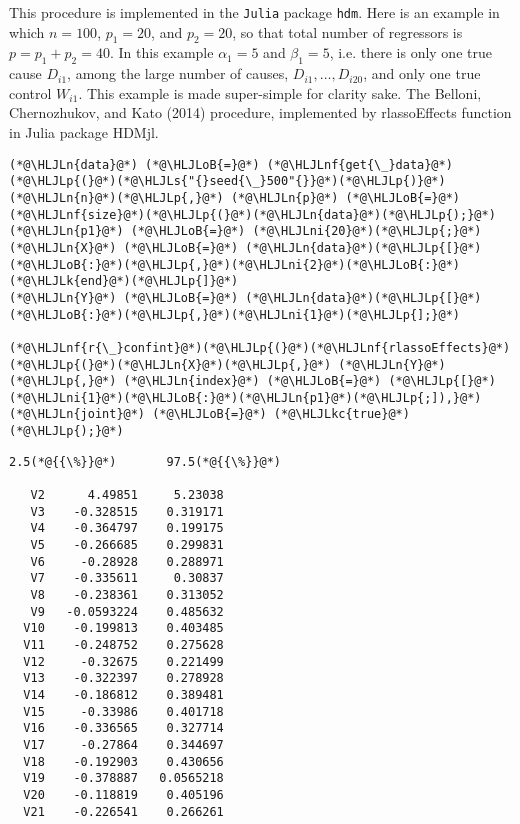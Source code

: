 \documentclass[12pt,a4paper]{article}
\newcommand{\HLJLk}[1]{\textcolor[RGB]{148,91,176}{\textbf{#1}}}
\newcommand{\HLJLkc}[1]{\textcolor[RGB]{59,151,46}{\textit{#1}}}
\newcommand{\HLJLn}[1]{#1}
\newcommand{\HLJLnf}[1]{\textcolor[RGB]{66,102,213}{#1}}
\newcommand{\HLJLs}[1]{\textcolor[RGB]{201,61,57}{#1}}
\newcommand{\HLJLni}[1]{\textcolor[RGB]{59,151,46}{#1}}
\newcommand{\HLJLoB}[1]{\textcolor[RGB]{102,102,102}{\textbf{#1}}}
\newcommand{\HLJLp}[1]{#1}
\begin{document}
This procedure is implemented in the \texttt{Julia} package \texttt{hdm}. Here is an example in which $n = 100$, $p_1 = 20$, and $p_2 = 20$, so that total number of regressors is $p = p_1 + p_2 = 40$. In this example $\alpha_1 = 5$ and $\beta_1 = 5$, i.e. there is only one true cause $D_{i1}$, among the large number of causes, $D_{i1}, \dots, D_{i20}$, and only one true control $W_{i1}$. This example is made super-simple for clarity sake. The Belloni, Chernozhukov, and Kato (2014) procedure, implemented by rlassoEffects function in Julia package HDMjl.


\begin{lstlisting}
(*@\HLJLn{data}@*) (*@\HLJLoB{=}@*) (*@\HLJLnf{get{\_}data}@*)(*@\HLJLp{(}@*)(*@\HLJLs{"{}seed{\_}500"{}}@*)(*@\HLJLp{)}@*)
(*@\HLJLn{n}@*)(*@\HLJLp{,}@*) (*@\HLJLn{p}@*) (*@\HLJLoB{=}@*) (*@\HLJLnf{size}@*)(*@\HLJLp{(}@*)(*@\HLJLn{data}@*)(*@\HLJLp{);}@*)
(*@\HLJLn{p1}@*) (*@\HLJLoB{=}@*) (*@\HLJLni{20}@*)(*@\HLJLp{;}@*)
(*@\HLJLn{X}@*) (*@\HLJLoB{=}@*) (*@\HLJLn{data}@*)(*@\HLJLp{[}@*)(*@\HLJLoB{:}@*)(*@\HLJLp{,}@*)(*@\HLJLni{2}@*)(*@\HLJLoB{:}@*)(*@\HLJLk{end}@*)(*@\HLJLp{]}@*)
(*@\HLJLn{Y}@*) (*@\HLJLoB{=}@*) (*@\HLJLn{data}@*)(*@\HLJLp{[}@*)(*@\HLJLoB{:}@*)(*@\HLJLp{,}@*)(*@\HLJLni{1}@*)(*@\HLJLp{];}@*)

(*@\HLJLnf{r{\_}confint}@*)(*@\HLJLp{(}@*)(*@\HLJLnf{rlassoEffects}@*)(*@\HLJLp{(}@*)(*@\HLJLn{X}@*)(*@\HLJLp{,}@*) (*@\HLJLn{Y}@*)(*@\HLJLp{,}@*) (*@\HLJLn{index}@*) (*@\HLJLoB{=}@*) (*@\HLJLp{[}@*)(*@\HLJLni{1}@*)(*@\HLJLoB{:}@*)(*@\HLJLn{p1}@*)(*@\HLJLp{;]),}@*) (*@\HLJLn{joint}@*) (*@\HLJLoB{=}@*) (*@\HLJLkc{true}@*)(*@\HLJLp{);}@*)
\end{lstlisting}

\begin{lstlisting}
2.5(*@{{\%}}@*)       97.5(*@{{\%}}@*)

   V2      4.49851     5.23038
   V3    -0.328515    0.319171
   V4    -0.364797    0.199175
   V5    -0.266685    0.299831
   V6     -0.28928    0.288971
   V7    -0.335611     0.30837
   V8    -0.238361    0.313052
   V9   -0.0593224    0.485632
  V10    -0.199813    0.403485
  V11    -0.248752    0.275628
  V12     -0.32675    0.221499
  V13    -0.322397    0.278928
  V14    -0.186812    0.389481
  V15     -0.33986    0.401718
  V16    -0.336565    0.327714
  V17     -0.27864    0.344697
  V18    -0.192903    0.430656
  V19    -0.378887   0.0565218
  V20    -0.118819    0.405196
  V21    -0.226541    0.266261
\end{lstlisting}
\end{document}
